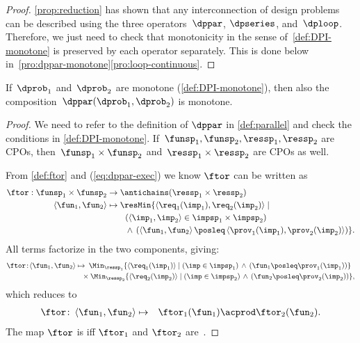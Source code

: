 \begin{proof}
  \cref{prop:reduction} has shown that any interconnection of design
  problems can be described using the three operators~$\dppar$, $\dpseries$,
  and~$\dploop$. Therefore, we just need to check that monotonicity
  in the sense of~\cref{def:DPI-monotone} is preserved by each operator
  separately. This is done below in~\cref{pro:dppar-monotone}\textendash\ref{pro:loop-continuous}.
\end{proof}

\begin{proposition}
  \label{pro:dppar-monotone}If~$\dprob_{1}$ and~$\dprob_{2}$ are
  monotone (\cref{def:DPI-monotone}), then also the composition~$\dppar(\dprob_{1},\dprob_{2})$
  is monotone.
\end{proposition}
\begin{proof}
  We need to refer to the definition of $\dppar$ in \cref{def:parallel}
  and check the conditions in \cref{def:DPI-monotone}. If~$\funsp_{1},\funsp_{2},\ressp_{1},\ressp_{2}$
  are CPOs, then~$\funsp_{1}\times\funsp_{2}$ and~$\ressp_{1}\times\ressp_{2}$
  are CPOs as well.

  From \cref{def:ftor} and (\ref{eq:dppar-exec}) we know $\ftor$ can
  be written as
  \begin{align*}
    \ftor:\funsp_{1}\times\funsp_{2} & \rightarrow\antichains(\ressp_{1}\times\ressp_{2})\\
    \left\langle \fun_{1},\fun_{2}\right\rangle  & \mapsto\resMin\{\left\langle \req_{1}(\imp_{1}),\req_{2}(\imp_{2})\right\rangle \mid\\
    & \qquad\left(\left\langle \imp_{1},\imp_{2}\right\rangle \in\impsp_{1}\times\impsp_{2}\right)\\
    & \qquad\,\wedge\,\left(\left\langle \fun_{1},\fun_{2}\right\rangle \posleq\left\langle \prov_{1}(\imp_{1}),\prov_{2}(\imp_{2})\right\rangle \right)\}.
  \end{align*}
  All terms factorize in the two components, giving:{\small{}
    \begin{align*}
      \ftor\!:\!\left\langle \fun_{1},\fun_{2}\right\rangle \mapsto & \!\!\!\quad\Min_{\ressp_{1}}\{\left\langle \req_{1}(\imp_{1})\right\rangle \mid\left(\imp\in\impsp_{1}\right)\,\wedge\,\left(\fun_{1}\posleq\prov_{1}(\imp_{1})\right)\}\\
      & \!\!\!\times\Min_{\ressp_{2}}\{\left\langle \req_{2}(\imp_{2})\right\rangle \mid\left(\imp\in\impsp_{2}\right)\,\wedge\,\left(\fun_{2}\posleq\prov_{2}(\imp_{2})\right)\},
    \end{align*}
  }which reduces to
  \begin{eqnarray}
    \ftor\colon\left\langle \fun_{1},\fun_{2}\right\rangle  & \mapsto & \ftor_{1}(\fun_{1})\acprod\ftor_{2}(\fun_{2}).\label{eq:isproduct}
  \end{eqnarray}
  The map $\ftor$ is \scottcontinuous iff $\ftor_{1}$ and $\ftor_{2}$
  are~\cite[Lemma II.2.8]{gierz03continuous}.
\end{proof}

